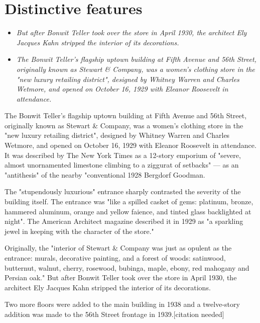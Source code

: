 \section{Distinctive features}\label{distinctive-features}

\begin{itemize}
\item
  \emph{But after Bonwit Teller took over the store in April 1930, the
  architect Ely Jacques Kahn stripped the interior of its decorations.}
\item
  \emph{The Bonwit Teller's flagship uptown building at Fifth Avenue and
  56th Street, originally known as Stewart \& Company, was a women's
  clothing store in the "new luxury retailing district", designed by
  Whitney Warren and Charles Wetmore, and opened on October 16, 1929
  with Eleanor Roosevelt in attendance.}
\end{itemize}

The Bonwit Teller's flagship uptown building at Fifth Avenue and 56th
Street, originally known as Stewart \& Company, was a women's clothing
store in the "new luxury retailing district", designed by Whitney Warren
and Charles Wetmore, and opened on October 16, 1929 with Eleanor
Roosevelt in attendance. It was described by The New York Times as a
12-story emporium of "severe, almost unornamented limestone climbing to
a ziggurat of setbacks" --- as an "antithesis" of the nearby
"conventional 1928 Bergdorf Goodman.

The "stupendously luxurious" entrance sharply contrasted the severity of
the building itself. The entrance was "like a spilled casket of gems:
platinum, bronze, hammered aluminum, orange and yellow faience, and
tinted glass backlighted at night". The American Architect magazine
described it in 1929 as "a sparkling jewel in keeping with the character
of the store."

Originally, the "interior of Stewart \& Company was just as opulent as
the entrance: murals, decorative painting, and a forest of woods:
satinwood, butternut, walnut, cherry, rosewood, bubinga, maple, ebony,
red mahogany and Persian oak." But after Bonwit Teller took over the
store in April 1930, the architect Ely Jacques Kahn stripped the
interior of its decorations.

Two more floors were added to the main building in 1938 and a
twelve-story addition was made to the 56th Street frontage in
1939.{[}citation needed{]}

